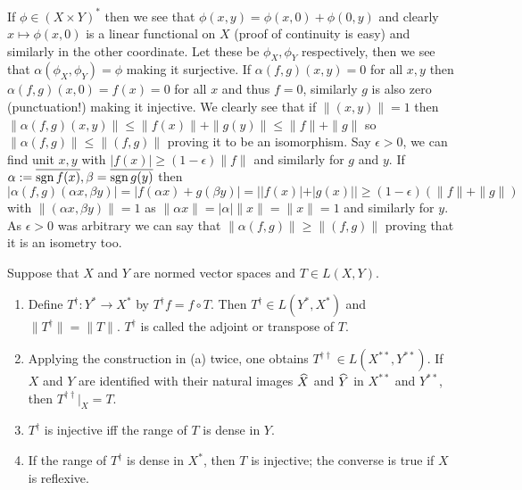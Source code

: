 \documentclass[12pt,a4paper]{article}
\begin{document}
\begin{solution}
    If $\phi\in(X\times Y)^*$ then we see that $\phi(x,y)=\phi(x,0)+\phi(0,y)$ and clearly $x\mapsto\phi(x,0)$ is a linear functional on $X$ (proof of continuity is easy) and similarly in the other coordinate.
    Let these be $\phi_X,\phi_Y$ respectively, then we see that $\alpha(\phi_X,\phi_Y)=\phi$ making it surjective. 
    If $\alpha(f,g)(x,y)=0$ for all $x,y$ then $\alpha(f,g)(x,0)=f(x)=0$ for all $x$ and thus $f=0$, similarly $g$ is also zero (punctuation!) making it injective. 
    We clearly see that if $\|(x,y)\| = 1$ then $\|\alpha(f,g)(x,y)\|\leq\|f(x)\|+\|g(y)\|\leq\|f\|+\|g\|$ so $\|\alpha(f,g)\|\leq\|(f,g)\|$ proving it to be an isomorphism. 
    Say $\epsilon>0$, we can find unit $x,y$ with $|f(x)|\geq(1-\epsilon)\|f\|$ and similarly for $g$ and $y$. 
    If $\alpha:= \overline{\operatorname{sgn} f(x)},\beta=\overline{\operatorname{sgn} g(y)}$ then 
    \[
        |\alpha(f,g)(\alpha x,\beta y)|=|f(\alpha x)+g(\beta y)|=||f(x)|+|g(x)||\geq(1-\epsilon)(\|f\|+\|g\|)
    \]
    with $\|(\alpha x,\beta y)\|=1$ as $\|\alpha x\|=|\alpha|\|x\|=\|x\|=1$ and similarly for $y$. 
    As $\epsilon>0$ was arbitrary we can say that $\|\alpha(f,g)\|\geq\|(f,g)\|$ proving that it is an isometry too. 
\end{solution}
\begin{problem}\label{prob:5-22}
Suppose that $X$ and $Y$ are normed vector spaces and $T \in L(X,Y)$.
\begin{enumerate}[label=\alph*.]
\item Define $T^\dagger : Y^* \rightarrow X^*$ by $T^\dagger f = f \circ T$. Then $T^\dagger \in L(Y^*,X^*)$ and $\|T^\dagger\| = \|T\|$. $T^\dagger$ is called the adjoint or transpose of $T$.
\item Applying the construction in (a) twice, one obtains $T^{\dagger\dagger} \in L(X^{**},Y^{**})$. If $X$ and $Y$ are identified with their natural images $\widehat{X}$ and $\widehat{Y}$ in $X^{**}$ and $Y^{**}$, then $T^{\dagger\dagger}|_X = T$.
\item $T^\dagger$ is injective iff the range of $T$ is dense in $Y$.
\item If the range of $T^\dagger$ is dense in $X^*$, then $T$ is injective; the converse is true if $X$ is reflexive.
\end{enumerate}
\end{problem}
\end{document}
